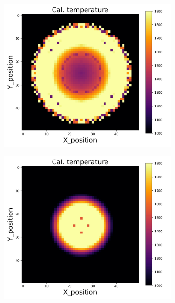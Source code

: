 {\begin{figure}[p]
\begin{minipage}{\textwidth}
\begin{subfigure}{0.325\textwidth}
        \end{subfigure}
    \end{minipage}\\
    \begin{minipage}{\textwidth}
        \centering
        \begin{subfigure}{0.325\textwidth}
            \centering
            \includegraphics[width=\textwidth]{figures/raw_data/32/exp/T_cal.jpg}
        \end{subfigure}
        \begin{subfigure}{0.325\textwidth}
            \centering
            \includegraphics[width=\textwidth]{figures/raw_data/33/exp/T_cal.jpg}

\end{subfigure}
\end{minipage}
\end{figure}}
